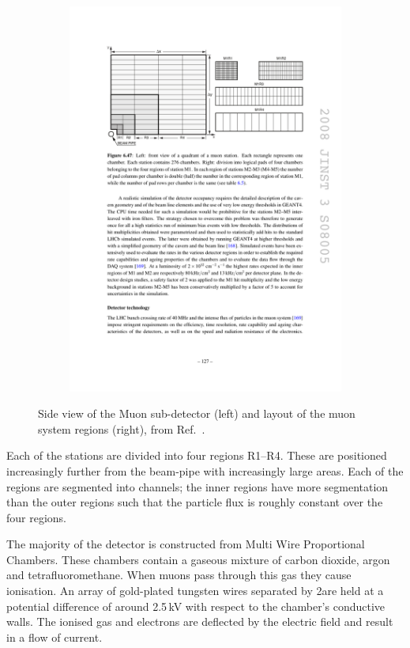 \begin{figure}[!h]
\begin{subfigure}[t]{0.4\textwidth}
        \centering
        \includegraphics[width=1.0\textwidth]{figs/Detector/muon_cells_layout.pdf}
    \end{subfigure}
    \caption{Side view of the Muon sub-detector (left) and layout of the muon system regions (right), from Ref.~\cite{Alves:2008zz}.}
    \label{fig:Dec_muon_schematic}   
\end{figure}

Each of the stations are divided into four regions R1--R4. These are positioned increasingly further from the beam-pipe with increasingly large areas. Each of the regions are segmented into channels; the inner regions have more segmentation than the outer regions such that the particle flux is roughly constant over the four regions.   

The majority of the detector is constructed from Multi Wire Proportional Chambers. These chambers contain a gaseous mixture of carbon dioxide, argon and tetrafluoromethane. When muons pass through this gas they cause ionisation. An array of gold-plated tungsten wires separated by 2\mm are held at a potential difference of around 2.5\,kV with respect to the chamber's conductive walls. The ionised gas and electrons are deflected by the electric field and result in a flow of current. 

